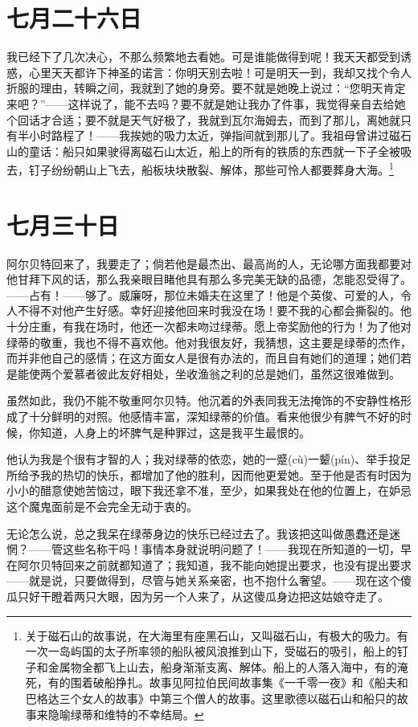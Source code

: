 \documentclass[12pt,oneside]{book}
\begin{document}
\chapter{七月二十六日}
\label{sec-2-27}
我已经下了几次决心，不那么频繁地去看她。可是谁能做得到呢！我天天都受到诱惑，心里天天都许下神圣的诺言：你明天别去啦！可是明天一到，我却又找个令人折服的理由，转瞬之间，我就到了她的身旁。要不就是她晚上说过：“您明天肯定来吧？”——这样说了，能不去吗？要不就是她让我办了件事，我觉得亲自去给她个回话才合适；要不就是天气好极了，我就到瓦尔海姆去，而到了那儿，离她就只有半小时路程了！——我挨她的吸力太近，弹指间就到那儿了。我祖母曾讲过磁石山的童话：船只如果驶得离磁石山太近，船上的所有的铁质的东西就一下子全被吸去，钉子纷纷朝山上飞去，船板块块散裂、解体，那些可怜人都要葬身大海。\footnote{关于磁石山的故事说，在大海里有座黑石山，又叫磁石山，有极大的吸力。有一次一岛屿国的太子所率领的船队被风浪推到山下，受磁石的吸引，船上的钉子和金属物全都飞上山去，船身渐渐支离、解体。船上的人落入海中，有的淹死，有的围着破船挣扎。故事见阿拉伯民间故事集《一千零一夜》和《船夫和巴格达三个女人的故事》中第三个僧人的故事。这里歌德以磁石山和船只的故事来隐喻绿蒂和维特的不幸结局。}


\chapter{七月三十日}
\label{sec-2-28}
阿尔贝特回来了，我要走了；倘若他是最杰出、最高尚的人，无论哪方面我都要对他甘拜下风的话，那么我亲眼目睹他具有那么多完美无缺的品德，怎能忍受得了。——占有！——够了。威廉呀，那位未婚夫在这里了！他是个英俊、可爱的人，令人不得不对他产生好感。幸好迎接他回来时我没在场！要不我的心都会撕裂的。他十分庄重，有我在场时，他还一次都未吻过绿蒂。愿上帝奖励他的行为！为了他对绿蒂的敬重，我也不得不喜欢他。他对我很友好，我猜想，这主要是绿蒂的杰作，而并非他自己的感情；在这方面女人是很有办法的，而且自有她们的道理；她们若是能使两个爱慕者彼此友好相处，坐收渔翁之利的总是她们，虽然这很难做到。

虽然如此，我仍不能不敬重阿尔贝特。他沉着的外表同我无法掩饰的不安静性格形成了十分鲜明的对照。他感情丰富，深知绿蒂的价值。看来他很少有脾气不好的时候，你知道，人身上的坏脾气是种罪过，这是我平生最恨的。

他认为我是个很有才智的人；我对绿蒂的依恋，她的一蹙(cù)一颦(pín)、举手投足所给予我的热切的快乐，都增加了他的胜利，因而他更爱她。至于他是否有时因为小小的醋意使她苦恼过，眼下我还拿不准，至少，如果我处在他的位置上，在妒忌这个魔鬼面前是不会完全无动于衷的。

无论怎么说，总之我呆在绿蒂身边的快乐已经过去了。我该把这叫做愚蠢还是迷惘？——管这些名称干吗！事情本身就说明问题了！——我现在所知道的一切，早在阿尔贝特回来之前就都知道了；我知道，我不能向她提出要求，也没有提出要求——就是说，只要做得到，尽管与她关系亲密，也不抱什么奢望。——现在这个傻瓜只好干瞪着两只大眼，因为另一个人来了，从这傻瓜身边把这姑娘夺走了。
\end{document}
